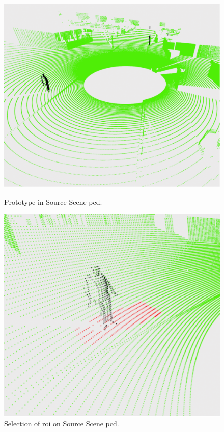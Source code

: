 \begin{figure}[htbp]
    \centering
    \begin{minipage}[b]{0.45\textwidth}
    \centering
    \includegraphics[width=1\linewidth]{97_graphics/results/prototype_on_source_scene_cloud.pdf}
    \caption{Prototype in Source Scene \acrshort{pcd}.}
    \label{fig:result-prototype_on_source_scene}
    \end{minipage}
    \hfill
    \begin{minipage}[b]{0.45\textwidth}
    \centering
    \includegraphics[width=1\linewidth]{97_graphics/results/roi_select_source_scene_cloud.pdf}
    \caption{Selection of \acrshort{roi} on Source Scene \acrshort{pcd}.}
    \label{fig:result-roi_select_source_scene}
    \end{minipage}
\end{figure}


